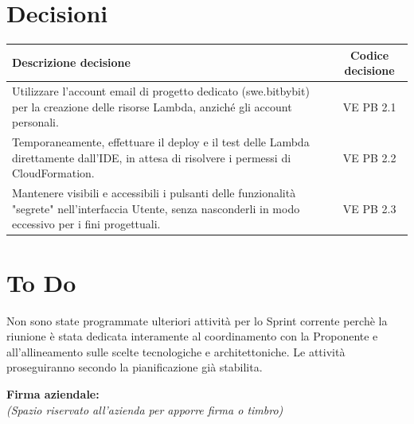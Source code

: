 \documentclass[a4paper,12pt]{article}
\newcommand{\ignoreglossary}{}
\begin{document}
\section{Decisioni}
\begin{center}
\small
\renewcommand{\arraystretch}{1.2} 
\begin{tabular}{|p{}|c|}
\hline
\rowcolor{gray!60} 
\textbf{Descrizione decisione} & \textbf{Codice decisione} \\
\hline
Utilizzare l'account email di progetto dedicato (swe.bitbybit) per la creazione delle risorse Lambda, anziché gli account personali. & VE \ignoreglossary{PB} 2.1 \\
\hline
Temporaneamente, effettuare il deploy e il test delle Lambda direttamente dall'IDE, in attesa di risolvere i permessi di CloudFormation. &  VE \ignoreglossary{PB} 2.2 \\
\hline
Mantenere visibili e accessibili i pulsanti delle funzionalità "segrete" nell'interfaccia Utente, senza nasconderli in modo eccessivo per i fini progettuali. &  VE \ignoreglossary{PB} 2.3\\
\hline
\end{tabular}
\end{center}

\section{To Do}
Non sono state programmate ulteriori attività per lo Sprint corrente perchè la riunione è stata dedicata interamente al coordinamento con la Proponente e all'allineamento sulle scelte tecnologiche e architettoniche. Le attività proseguiranno secondo la pianificazione già stabilita.


\vspace*{\fill}
\noindent
\begin{minipage}{0.60\textwidth}
    {\small
    \textbf{Firma aziendale:}\\[0.3cm]
    \textit{(Spazio riservato all’azienda per apporre firma o timbro)}\\[0.8cm]
    \fbox{\rule{0pt}{2.5cm}\rule{5cm}{0pt}} 
    }
\end{minipage}
\end{document}
